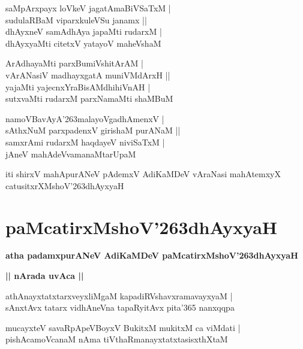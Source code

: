 \documentclass[twoside,12pt,openright]{book}
\def\S{\char'263}
\newcounter{shloka}[chapter]
\def\uvaca#1{\centerline{{\large\textbf{#1}}}}
\begin{document}
\begin{shloka}
saMpArxpayx loVkeV jagatAmaBiVSaTxM |\\
sudulaRBaM viparxkuleVSu janamx ||\\
dhAyxneV samAdhAya japaMti rudarxM |\\
dhAyxyaMti citetxV yatayoV maheVshaM \\
\end{shloka}

\begin{shloka}
ArAdhayaMti parxBumiVshitArAM |\\
vArANasiV madhayxgatA muniVMdArxH ||\\
yajaMti yajecnxYraBisAMdhihiVnAH |\\
sutxvaMti rudarxM parxNamaMti shaMBuM \\
\end{shloka}

\begin{shloka}
namoVBavAyA\S malayoVgadhAmenxV |\\
sAthxNuM parxpadenxV girishaM purANaM ||\\
samxrAmi rudarxM haqdayeV niviSaTxM |\\
jAneV mahAdeVvamanaMtarUpaM \\
\end{shloka}

\begin{center}
iti shirxV mahApurANeV pAdemxV AdiKaMDeV vAraNasi mahAtemxyX catusitxrXMshoV\S dhAyxyaH 
\end{center}

\chapter{paMcatirxMshoV\S dhAyxyaH}

\begin{center}
{\LARGE\bfseries atha padamxpurANeV AdiKaMDeV paMcatirxMshoV\S dhAyxyaH}
\end{center}

\uvaca{ || nArada uvAca || }

\begin{shloka}
athAnayxtatxtarxveyxliMgaM kapadiRVshavxramavayxyaM |\\
sAnxtAvx tatarx vidhAneVna tapaRyitAvx pita\char'365 nanxqqpa 
\end{shloka}

\begin{shloka}
mucayxteV savaRpApeVBoyxV BukitxM mukitxM ca viMdati |\\
pishAcamoVcanaM nAma tiVthaRmanayxtatxtasisxthXtaM 
\end{shloka}
\end{document}
